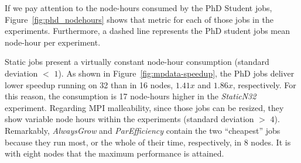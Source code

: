 \documentclass[a4paper,fleqn]{cas-dc}
\begin{document}
If we pay attention to the node-hours consumed by the PhD Student jobs, Figure~\ref{fig:phd_nodehours} shows that metric for each of those jobs in the experiments. 
Furthermore, a dashed line represents the PhD student jobs mean node-hour per experiment.

Static jobs present a virtually constant node-hour consumption (standard deviation $<$ $1$). 
As shown in Figure~\ref{fig:mpdata-speedup}, the PhD jobs deliver lower speedup running on 32 than in 16 nodes, $1.41x$ and $1.86x$, respectively.
For this reason, the consumption is 17 node-hours higher in the \textit{StaticN32} experiment.
Regarding MPI malleability, since those jobs can be resized, they show variable node hours within the experiments (standard deviation $>$ $4$).
Remarkably, \textit{AlwaysGrow} and \textit{ParEfficiency} contain the two ``cheapest'' jobs because they run most, or the whole of their time, respectively, in 8 nodes. It is with eight nodes that the maximum performance is attained.
\end{document}
